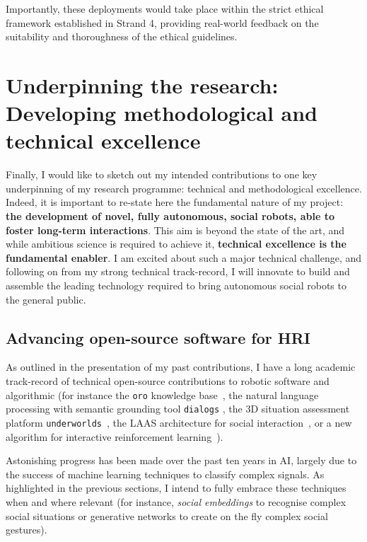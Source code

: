 Importantly, these deployments would take place within the strict ethical framework
established in Strand 4, providing real-world feedback on the suitability and
thoroughness of the ethical guidelines.




\section{Underpinning the research: Developing methodological and technical
excellence}

Finally, I would like to sketch out my intended contributions to one key
underpinning of my research programme: technical and methodological excellence.
Indeed, it is important to re-state here the fundamental nature of my project:
\textbf{the development of novel, fully autonomous, social robots, able to
foster long-term interactions}. This aim is beyond the state of the art, and
while ambitious science is required to achieve it, \textbf{technical excellence
is the fundamental enabler}. I am excited about such a major technical
challenge, and following on from my strong technical track-record, I will
innovate to build and assemble the leading technology required to bring
autonomous social robots to the general public.

\subsection{Advancing open-source software for HRI}

As outlined in the presentation of my past contributions, I have a long academic
track-record of technical open-source contributions to robotic software and
algorithmic (for instance the \texttt{oro} knowledge
base~\autocite{lemaignan2010oro}, the natural language processing with semantic
grounding tool \texttt{dialogs} \autocite{lemaignan2011grounding}, the 3D
situation assessment platform
\texttt{underworlds}~\autocite{lemaignan2018underworlds}, the LAAS architecture
for social interaction~\autocite{lemaignan2017artificial}, or a new algorithm
for interactive reinforcement learning~\autocite{senft2017supervised}).

Astonishing progress has been made over the past ten years in AI, largely due to
the success of machine learning techniques to classify complex signals. As
highlighted in the previous sections, I intend to fully embrace these techniques
when and where relevant (for instance, \emph{social embeddings} to recognise
complex social situations or generative networks to create on the fly complex
social gestures).

